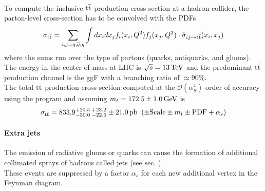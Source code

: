 \\
To compute the inclusive ${{\text{t}}{\bar{\text{t}}}}$ production cross-section at a hadron collider, the parton-level cross-section has to be convolved with the PDFs
\begin{equation}
    \sigma_{\mathrm{t\bar{t}}}=\sum_{i,j=q,\overline{{{q}}},g}\int d x_{i}d x_{j}f_{i}(x_{i},Q^{2})f_{j}(x_{j},Q^{2})\cdot\hat{\sigma}_{i j\rightarrow {\ensuremath{{\text{t}}{\bar{\text{t}}}}}}(x_i,x_j)
\end{equation}
where the sums run over the type of partons (quarks, antiquarks, and gluons).
The energy in the center of mass at LHC is $\sqrt{s}=13 {\,\text{Te\hspace{-.08em}V}}$ and the predominant ${{\text{t}}{\bar{\text{t}}}}$ production channel is the ggF with a branching ratio of $\simeq 90\%$.\\
The total ${{\text{t}}{\bar{\text{t}}}}$ production cross-section computed at the $\mathcal{O} (\alpha_S^4)$ order of accuracy using the program \Toppp \cite{Czakon2014Top++:Colliders} and assuming $m_t=172.5 \pm 1.0 {\,\text{Ge\hspace{-.08em}V}}$ is  \cite{TtbarNNLOTWiki}
\begin{equation}
    \sigma_{{\text{t}}{\bar{\text{t}}}} = 833.9^{+20.5}_{-30.0}\, ^{+23.2}_{-22.5}\pm 21.0\,  \text{pb}\; \; (\pm \text{Scale} \pm m_t \pm \text{PDF}+\alpha_s)
\end{equation}
\paragraph*{Extra jets}
The emission of radiative gluons or quarks can cause the formation of additional collimated sprays of hadrons called jets (see sec. \ADDREF).\\
These events are suppressed by a factor $\alpha_s$ for each new additional vertex in the Feynman diagram.

